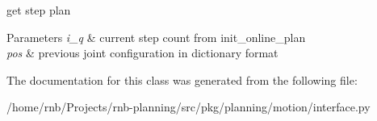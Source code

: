 get step plan 


\begin{DoxyParams}{Parameters}
{\em i\+\_\+q} & current step count from init\+\_\+online\+\_\+plan \\
\hline
{\em pos} & previous joint configuration in dictionary format \\
\hline
\end{DoxyParams}


The documentation for this class was generated from the following file\+:\begin{DoxyCompactItemize}
\item 
/home/rnb/\+Projects/rnb-\/planning/src/pkg/planning/motion/interface.\+py\end{DoxyCompactItemize}
